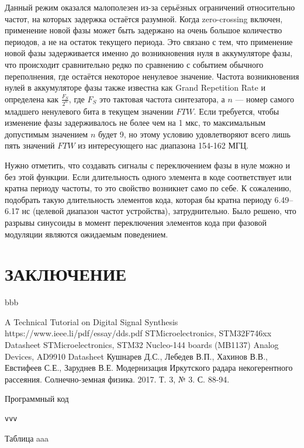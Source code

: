 \documentclass[rusmathsym, eqnumwithinsec, amspack, hyperref]{bomgost}
\begin{document}
Данный режим оказался малополезен из-за серьёзных ограничений относительно частот, на которых задержка остаётся разумной. Когда zero-crossing включен, применение новой фазы может быть задержано на очень большое количество периодов, а не на остаток текущего периода. Это связано с тем, что применение новой фазы задерживается именно до возникновения нуля в аккумуляторе фазы, что происходит сравнительно редко по сравнению с событием обычного переполнения, где остаётся некоторое ненулевое значение. Частота возникновения нулей в аккумуляторе фазы также известна как Grand Repetition Rate и определена как $\frac{F_S}{2^n}$, где $F_S$ это тактовая частота синтезатора, а $n$ --- номер самого младшего ненулевого бита в текущем значении $FTW$. Если требуется, чтобы изменение фазы задерживалось не более чем на 1 мкс, то максимальным допустимым значением $n$ будет 9, но этому условию удовлетворяют всего лишь пять значений $FTW$ из интересующего нас диапазона 154-162 МГЦ.

Нужно отметить, что создавать сигналы с переключением фазы в нуле можно и без этой функции. Если длительность одного элемента в коде соответствует или кратна периоду частоты, то это свойство возникнет само по себе. К сожалению, подобрать такую длительность элементов кода, которая бы кратна периоду 6.49--6.17 нс (целевой диапазон частот устройства), затруднительно. Было решено, что разрывы синусоиды в момент переключения элементов кода при фазовой модуляции являются ожидаемым поведением.

\section*{ЗАКЛЮЧЕНИЕ}
bbb

\begin{thebibliography}{11}
 A Technical Tutorial
on Digital Signal Synthesis https://www.ieee.li/pdf/essay/dds.pdf
 STMicroelectronics, STM32F746xx Datasheet
 STMicroelectronics, STM32 Nucleo-144 boards (MB1137)
 Analog Devices, AD9910 Datasheet
 Кушнарев Д.С., Лебедев В.П., Хахинов В.В., Евстифеев С.Е., Заруднев В.Е. Модернизация Иркутского радара некогерентного рассеяния. Солнечно-земная физика. 2017. Т. 3, № 3. С. 88-94.
\end{thebibliography}

\appendix

\begin{gostappendix}{Программный код}
\lstset{language=[11]c++,basicstyle=\ttfamily, showstringspaces=false}

\begin{lstlisting}
vvv
\end{lstlisting}
\end{gostappendix}


\begin{gostappendix}{Таблица}
aaa
\end{gostappendix}
\end{document}
